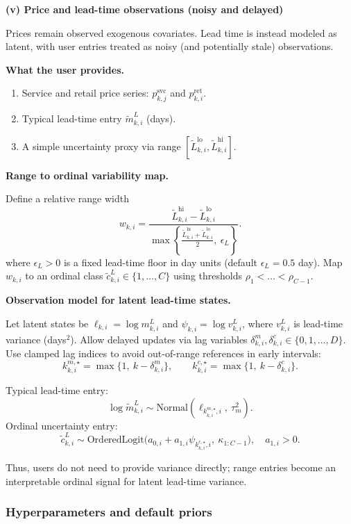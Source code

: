 \documentclass[11pt]{article}
\begin{document}
\textbf{(v) Price and lead-time observations (noisy and delayed)}

Prices remain observed exogenous covariates. Lead time is instead modeled as latent, with user entries treated as noisy (and potentially stale) observations.

\textbf{What the user provides.}
\begin{enumerate}
  \item Service and retail price series: $p^{\mathrm{svc}}_{k,j}$ and $p^{\mathrm{ret}}_{k,i}$.
  \item Typical lead-time entry $\tilde m^L_{k,i}$ (days).
  \item A simple uncertainty proxy via range $[\tilde L^{\mathrm{lo}}_{k,i},\tilde L^{\mathrm{hi}}_{k,i}]$.
\end{enumerate}

\textbf{Range to ordinal variability map.}

Define a relative range width
\[
  w_{k,i}=\frac{\tilde L^{\mathrm{hi}}_{k,i}-\tilde L^{\mathrm{lo}}_{k,i}}{\max\!\left\{\frac{\tilde L^{\mathrm{hi}}_{k,i}+\tilde L^{\mathrm{lo}}_{k,i}}{2},\ \epsilon_L\right\}}.
\]
where $\epsilon_L>0$ is a fixed lead-time floor in day units (default $\epsilon_L=0.5$ day).
Map $w_{k,i}$ to an ordinal class $\tilde c^L_{k,i}\in\{1,\dots,C\}$ using thresholds $\rho_1<\dots<\rho_{C-1}$.

\textbf{Observation model for latent lead-time states.}

Let latent states be $\ell_{k,i}=\log m^L_{k,i}$ and $\psi_{k,i}=\log v^L_{k,i}$, where $v^L_{k,i}$ is lead-time variance (days$^2$).
Allow delayed updates via lag variables $\delta^{m}_{k,i},\delta^{c}_{k,i}\in\{0,1,\dots,D\}$.
Use clamped lag indices to avoid out-of-range references in early intervals:
\[
  k^{m,\star}_{k,i}=\max\{1,\ k-\delta^{m}_{k,i}\},\qquad
  k^{c,\star}_{k,i}=\max\{1,\ k-\delta^{c}_{k,i}\}.
\]

Typical lead-time entry:
\[
  \log \tilde m^L_{k,i} \sim \text{Normal}(\ell_{k^{m,\star}_{k,i},i},\ \tau_m^2).
\]
Ordinal uncertainty entry:
\[
  \tilde c^L_{k,i}\sim\text{OrderedLogit}\!\bigl(a_{0,i}+a_{1,i}\psi_{k^{c,\star}_{k,i},i},\ \kappa_{1:C-1}\bigr),\quad a_{1,i}>0.
\]

Thus, users do not need to provide variance directly; range entries become an interpretable ordinal signal for latent lead-time variance.

\subsubsection*{Hyperparameters and default priors}\label{sec:hyperparams}
\end{document}
